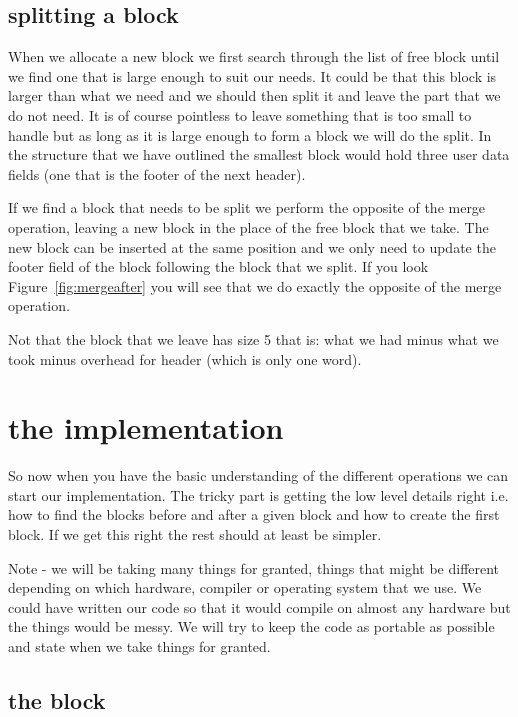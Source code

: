 \documentclass[a4paper,11pt]{article}
\begin{document}
\subsection{splitting a block}

When we allocate a new block we first search through the list of free
block until we find one that is large enough to suit our needs. It
could be that this block is larger than what we need and we should
then split it and leave the part that we do not need. It is of course
pointless to leave something that is too small to handle but as long
as it is large enough to form a block we will do the split. In the
structure that we have outlined the smallest block would hold three user
data fields (one that is the footer of the next header). 

If we find a block that needs to be split we perform the opposite of
the merge operation, leaving a new block in the place of the free
block that we take. The new block can be inserted at the same position
and we only need to update the footer field of the block following the
block that we split. If you look Figure~\ref{fig:mergeafter} you will
see that we do exactly the opposite of the merge operation.

Not that the block that we leave has size 5 that is: what we had minus
what we took minus overhead for header (which is only one word).

 \section{the implementation}

 So now when you have the basic understanding of the different
 operations we can start our implementation. The tricky part is
 getting the low level details right i.e. how to find the blocks
 before and after a given block and how to create the first block. If
 we get this right the rest should at least be simpler.

 Note - we will be taking many things for granted, things that might
 be different depending on which hardware, compiler or operating
 system that we use. We could have written our code so that it would
 compile on almost any hardware but the things would be messy. We will
 try to keep the code as portable as possible and state when we take
 things for granted.

 \subsection{the block}
\end{document}
